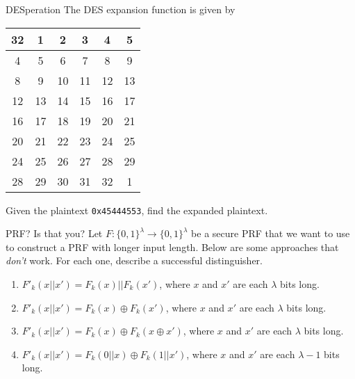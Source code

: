 \documentclass{practice}
\begin{document}
\begin{task}{DESperation}
  The DES expansion function is given by
  \begin{table}[h!]
    \centering
    \begin{tabular}{|c|c|c|c|c|c|}
      \hline
      32 &  1 &  2 &  3 &  4 &  5\\\hline
       4 &  5 &  6 &  7 &  8 &  9\\\hline
       8 &  9 & 10 & 11 & 12 & 13\\\hline
      12 & 13 & 14 & 15 & 16 & 17\\\hline
      16 & 17 & 18 & 19 & 20 & 21\\\hline
      20 & 21 & 22 & 23 & 24 & 25\\\hline
      24 & 25 & 26 & 27 & 28 & 29\\\hline
      28 & 29 & 30 & 31 & 32 &  1\\\hline
    \end{tabular}
    \vspace*{-0.7em}
  \end{table}

  Given the plaintext \texttt{0x45444553}, find the expanded plaintext.

\end{task}

\begin{task}{PRF? Is that you?}
  Let $F: \{0,1\}^\lambda \to \{0,1\}^\lambda$ be a secure PRF that we want to use to construct a PRF with longer input length.
  Below are some approaches\footnotemark{} that \emph{don't} work.
  For each one, describe a successful distinguisher.

  \begin{enumerate}
    \item $F'_k(x \vert\vert x') = F_k(x) \vert\vert F_k(x')$, where $x$ and $x'$ are each $\lambda$ bits long.
    \item $F'_k(x \vert\vert x') = F_k(x) \oplus F_k(x')$, where $x$ and $x'$ are each $\lambda$ bits long.
    \item $F'_k(x \vert\vert x') = F_k(x) \oplus F_k(x \oplus x')$, where $x$ and $x'$ are each $\lambda$ bits long.
    \item $F'_k(x \vert\vert x')= F_k(0\vert\vert x) \oplus F_k(1\vert\vert x')$, where $x$ and $x'$ are each $\lambda-1$ bits long.
  \end{enumerate}
\end{task}
\end{document}
